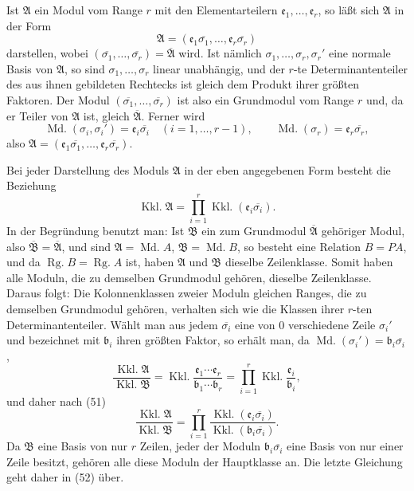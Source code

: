 \documentclass[11pt]{article}
\newcommand{\Rg}{\operatorname{Rg.}}
\newcommand{\Md}{\operatorname{Md.}}
\newcommand{\Kkl}{\operatorname{Kkl.}}
\begin{document}
Ist $\mathfrak A$ ein Modul vom Range $r$ mit den Elementarteilern $\mathfrak e_1,
\ldots,
\mathfrak e_r$, so läßt sich $\mathfrak A$ in der Form
\[
\mathfrak A=(\mathfrak e_1\overline{\sigma_1},
\ldots,
\mathfrak e_r\overline{\sigma_r})
\]
darstellen, wobei $(\overline{\sigma_1},
\ldots,
\overline{\sigma_r})=\overline{\mathfrak A}$ wird. Ist nämlich $\sigma_1,
\ldots,
\sigma_r,
\sigma_r'$ eine normale Basis von $\mathfrak A$, so sind $\sigma_1,
\ldots,
\sigma_r$ linear unabhängig, und der $r$-te Determinantenteiler des aus ihnen gebildeten Rechtecks ist gleich dem Produkt ihrer größten Faktoren. Der Modul $(\overline{\sigma_1},
\ldots,
\overline{\sigma_r})$ ist also ein Grundmodul vom Range $r$ und, da er Teiler von $\mathfrak A$ ist, gleich $\overline{\mathfrak A}$. Ferner wird
\[
\Md(\sigma_i,
\sigma_i')=\mathfrak e_i\overline{\sigma_i}
\quad(i=1,
\ldots,r-1),\qquad
\Md(\sigma_r)=\mathfrak e_r\overline{\sigma_r},
\]
also $\mathfrak A=(\mathfrak e_1\overline{\sigma_1},
\ldots,
\mathfrak e_r\overline{\sigma_r})$.

Bei jeder Darstellung des Moduls $\mathfrak A$ in der eben angegebenen Form besteht die Beziehung
\begin{equation}
\Kkl\mathfrak A=\prod_{i=1}^{r}\Kkl(\mathfrak e_i\overline{\sigma_i}).
\tag{52}
\end{equation}
In der Begründung benutzt man: Ist $\mathfrak B$ ein zum Grundmodul $\overline{\mathfrak A}$ gehöriger Modul, also $\overline{\mathfrak B}=\overline{\mathfrak A}$, und sind $\mathfrak A=\Md A$, $\mathfrak B=\Md B$, so besteht eine Relation $B=PA$, und da $\Rg B=\Rg A$ ist, haben $\mathfrak A$ und $\mathfrak B$ dieselbe Zeilenklasse. Somit haben alle Moduln, die zu demselben Grundmodul gehören, dieselbe Zeilenklasse. Daraus folgt: Die Kolonnenklassen zweier Moduln gleichen Ranges, die zu demselben Grundmodul gehören, verhalten sich wie die Klassen ihrer $r$-ten Determinantenteiler. Wählt man aus jedem $\overline{\sigma_i}$ eine von $0$ verschiedene Zeile $\sigma_i'$ und bezeichnet mit $\mathfrak b_i$ ihren größten Faktor, so erhält man, da $\Md(\sigma_i')=\mathfrak b_i\overline{\sigma_i}$,
\[
\frac{\Kkl\mathfrak A}{\Kkl\mathfrak B}
=\Kkl\frac{\mathfrak e_1\cdots\mathfrak e_r}{\mathfrak b_1\cdots\mathfrak b_r}
=\prod_{i=1}^{r}\Kkl\frac{\mathfrak e_i}{\mathfrak b_i},
\tag{51}
\]
und daher nach (51)
\[
\frac{\Kkl\mathfrak A}{\Kkl\mathfrak B}
=\prod_{i=1}^{r}\frac{\Kkl(\mathfrak e_i\overline{\sigma_i})}{\Kkl(\mathfrak b_i\overline{\sigma_i})}.
\]
Da $\mathfrak B$ eine Basis von nur $r$ Zeilen, jeder der Moduln $\mathfrak b_i\overline{\sigma_i}$ eine Basis von nur einer Zeile besitzt, gehören alle diese Moduln der Hauptklasse an. Die letzte Gleichung geht daher in (52) über.
\end{document}
